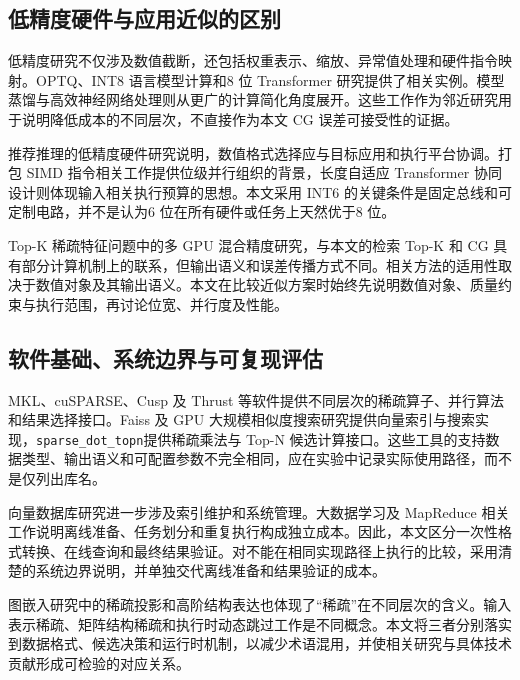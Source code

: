 \subsection{低精度硬件与应用近似的区别}
低精度研究不仅涉及数值截断，还包括权重表示、缩放、异常值处理和硬件指令映射。OPTQ、INT8 语言模型计算和8 位 Transformer 研究提供了相关实例\cite{frantar2023optq,dettmers2022gpt3,yu20248}。模型蒸馏与高效神经网络处理则从更广的计算简化角度展开\cite{sanh2019distilbert,sze2020efficient}。这些工作作为邻近研究用于说明降低成本的不同层次，不直接作为本文 CG 误差可接受性的证据。

推荐推理的低精度硬件研究说明，数值格式选择应与目标应用和执行平台协调\cite{deng2021low}。打包 SIMD 指令相关工作提供位级并行组织的背景\cite{miyaoka2002algorithm}，长度自适应 Transformer 协同设计则体现输入相关执行预算的思想\cite{peng2022length}。本文采用 INT6 的关键条件是固定总线和可定制电路，并不是认为6 位在所有硬件或任务上天然优于8 位。

Top-K 稀疏特征问题中的多 GPU 混合精度研究\cite{sgherzi2022mixed}，与本文的检索 Top-K 和 CG 具有部分计算机制上的联系，但输出语义和误差传播方式不同。相关方法的适用性取决于数值对象及其输出语义。本文在比较近似方案时始终先说明数值对象、质量约束与执行范围，再讨论位宽、并行度及性能。

\subsection{软件基础、系统边界与可复现评估}
MKL、cuSPARSE、Cusp 及 Thrust 等软件提供不同层次的稀疏算子、并行算法和结果选择接口\cite{wang2014intel,cusp,thrust_docs}。Faiss 及 GPU 大规模相似度搜索研究提供向量索引与搜索实现\cite{faiss,johnson2019billion}，\texttt{sparse\_dot\_topn}提供稀疏乘法与 Top-N 候选计算接口\cite{sparsedottopn}。这些工具的支持数据类型、输出语义和可配置参数不完全相同，应在实验中记录实际使用路径，而不是仅列出库名。

向量数据库研究进一步涉及索引维护和系统管理\cite{2021milvus}。大数据学习及 MapReduce 相关工作说明离线准备、任务划分和重复执行构成独立成本\cite{zhou2017machine,dean2008mapreduce}。因此，本文区分一次性格式转换、在线查询和最终结果验证。对不能在相同实现路径上执行的比较，采用清楚的系统边界说明，并单独交代离线准备和结果验证的成本。

图嵌入研究中的稀疏投影和高阶结构表达\cite{chen2019fast,morris2020weisfeiler}也体现了“稀疏”在不同层次的含义。输入表示稀疏、矩阵结构稀疏和执行时动态跳过工作是不同概念。本文将三者分别落实到数据格式、候选决策和运行时机制，以减少术语混用，并使相关研究与具体技术贡献形成可检验的对应关系。

